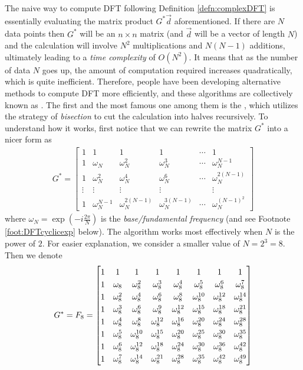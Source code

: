 The naive way to compute DFT following Definition \ref{defn:complexDFT} is essentially evaluating the matrix product $G^* \vec{d}$ aforementioned. If there are $N$ data points then $G^*$ will be an $n \times n$ matrix (and $\vec{d}$ will be a vector of length $N$) and the calculation will involve $N^2$ multiplications and $N(N-1)$ additions, ultimately leading to a \textit{time complexity} of $O(N^2)$. It means that as the number of data $N$ goes up, the amount of computation required increases quadratically, which is quite inefficient. Therefore, people have been developing alternative methods to compute DFT more efficiently, and these algorithms are collectively known as . The first and the most famous one among them is the , which utilizes the strategy of \textit{bisection} to cut the calculation into halves recursively. To understand how it works, first notice that we can rewrite the matrix $G^*$ into a nicer form as
\begin{align*}
G^* = 
\begin{bmatrix}
1 & 1 & 1 & 1 & \cdots & 1 \\
1 & \omega_N & \omega_N^2 & \omega_N^3 & \cdots & \omega_N^{N-1} \\
1 & \omega_N^2 & \omega_N^4 & \omega_N^6 & \cdots & \omega_N^{2(N-1)} \\
\vdots & \vdots & \vdots & \vdots & & \vdots \\
1 & \omega_N^{N-1} & \omega_N^{2(N-1)} & \omega_N^{3(N-1)} & \cdots & \omega_N^{(N-1)^2}
\end{bmatrix}
\end{align*}
where $\omega_N = \exp(-i\frac{2\pi}{N})$ is the \textit{base/fundamental frequency} (and see Footnote \ref{foot:DFTcyclicexp} below). The algorithm works most effectively when $N$ is the power of $2$. For easier explanation, we consider a smaller value of $N = 2^3 = 8$. Then we denote
\begin{align*}
\renewcommand\arraystretch{1.25}
G^* = F_8 = 
\begin{bmatrix}
1 & 1 & 1 & 1 & 1 & 1 & 1 & 1 \\
1 & \omega_8 & \omega_8^2 & \omega_8^3 & \omega_8^4 & \omega_8^5 & \omega_8^6 & \omega_8^7 \\
1 & \omega_8^2 & \omega_8^4 & \omega_8^6 & \omega_8^8 & \omega_8^{10} & \omega_8^{12} & \omega_8^{14} \\
1 & \omega_8^3 & \omega_8^6 & \omega_8^9 & \omega_8^{12} & \omega_8^{15} & \omega_8^{18} & \omega_8^{21} \\
1 & \omega_8^4 & \omega_8^8 & \omega_8^{12} & \omega_8^{16} & \omega_8^{20} & \omega_8^{24} & \omega_8^{28} \\
1 & \omega_8^5 & \omega_8^{10} & \omega_8^{15} & \omega_8^{20} & \omega_8^{25} & \omega_8^{30} & \omega_8^{35} \\
1 & \omega_8^6 & \omega_8^{12} & \omega_8^{18} & \omega_8^{24} & \omega_8^{30} & \omega_8^{36} & \omega_8^{42} \\
1 & \omega_8^7 & \omega_8^{14} & \omega_8^{21} & \omega_8^{28} & \omega_8^{35} & \omega_8^{42} & \omega_8^{49} 
\end{bmatrix}
\end{align*}
